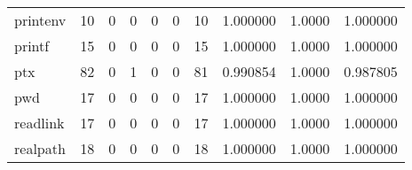 \begin{tabular}{lrrrrrrrrr}
printenv  &                                       10 &                                                  0 &                                                  0 &                                                  0 &                                                  0 &                                                 10 &                                           1.000000 &                                 1.0000 &                             1.000000 \\
printf    &                                       15 &                                                  0 &                                                  0 &                                                  0 &                                                  0 &                                                 15 &                                           1.000000 &                                 1.0000 &                             1.000000 \\
ptx       &                                       82 &                                                  0 &                                                  1 &                                                  0 &                                                  0 &                                                 81 &                                           0.990854 &                                 1.0000 &                             0.987805 \\
pwd       &                                       17 &                                                  0 &                                                  0 &                                                  0 &                                                  0 &                                                 17 &                                           1.000000 &                                 1.0000 &                             1.000000 \\
readlink  &                                       17 &                                                  0 &                                                  0 &                                                  0 &                                                  0 &                                                 17 &                                           1.000000 &                                 1.0000 &                             1.000000 \\
realpath  &                                       18 &                                                  0 &                                                  0 &                                                  0 &                                                  0 &                                                 18 &                                           1.000000 &                                 1.0000 &                             1.000000 \\

\end{tabular}
